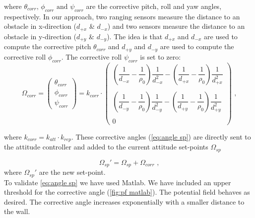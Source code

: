 where $\theta_{corr} \text{, } \phi_{corr} \text{ and } \psi_{corr}$ are the corrective pitch, roll and yaw angles, respectively. In our approach, two ranging sensors measure the distance to an obstacle in x-direction  ($d_{+x}$ \& $d_{-x}$) and two sensors measure the distance to an obstacle in y-direction ($d_{+y}$ \& $d_{-y}$). The idea is that $d_{+x}$ and $d_{-x}$ are used to compute the corrective pitch $\theta_{corr}$ and $d_{+y}$ and $d_{-y}$ are used to compute the corrective roll $\phi_{corr}$. The corrective roll $\psi_{corr}$ is set to zero:
\begin{equation}
	\label{eq:angle sp}
	\Omega_{corr} =
	\begin{pmatrix}
	\theta_{corr} \\ \phi_{corr} \\ \psi_{corr}
	\end{pmatrix} =
	k_{corr}\cdot 
	\begin{pmatrix}
	\left(\dfrac{1}{d_{-x}}-\dfrac{1}{\rho_0}\right)\dfrac{1}{d_{-x}^2}-\left(\dfrac{1}{d_{+x}}-\dfrac{1}{\rho_0}\right)\dfrac{1}{d_{+x}^2}\\\\
	\left(\dfrac{1}{d_{-y}}-\dfrac{1}{\rho_0}\right)\dfrac{1}{d_{-y}^2}-\left(\dfrac{1}{d_{+y}}-\dfrac{1}{\rho_0}\right)\dfrac{1}{d_{+y}^2} \\\\
	0
	\end{pmatrix}
	\text{ ,}
\end{equation}

where $k_{corr}=k_{att}\cdot k_{rep}$. These corrective angles (\cref{eq:angle sp}) are directly sent to the attitude controller and added to the current attitude set-points $\Omega_{sp}$

\begin{equation}
\label{eq:new sp}
	\Omega_{sp}' = \Omega_{sp} + \Omega_{corr} \text{ ,}
\end{equation}
where $\Omega_{sp}'$ are the new set-point. \\
To validate \cref{eq:angle sp} we have used Matlab. We have included an upper threshold for the corrective angle (\cref{fig:pf matlab}). The potential field behaves as desired. The corrective angle increases exponentially with a smaller distance to the wall. 

